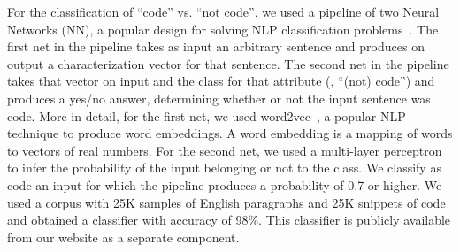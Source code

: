 \documentclass[sigconf,review, anonymous]{acmart}
\begin{document}
For the classification of ``code'' vs. ``not code'', we used a
pipeline of two Neural Networks (NN), a popular design for solving NLP
classification problems~. The first net in the pipeline
takes as input an arbitrary sentence and produces on output a
characterization vector for that sentence. The second net in the
pipeline takes that vector on input and the class for that attribute
(\ie{}, ``(not) code'') and produces a yes/no answer, determining
whether or not the input sentence was code. More in detail, for the
first net, we used word2vec~\cite{kusner2015word}, a popular NLP
technique to produce word embeddings. A word embedding is a mapping of
words to vectors of real numbers. For the second net, we used a
multi-layer perceptron~ to infer the probability of the
input belonging or not to the class. We classify as code an input for
which the pipeline produces a probability of 0.7 or higher. We used a
corpus with 25K samples of English paragraphs and 25K snippets of
\js{} code and obtained a classifier with accuracy of 98\%. This
classifier is publicly available from our website as a separate
component.


\end{document}
